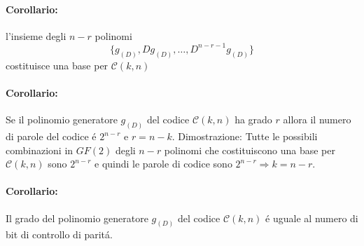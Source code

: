             \paragraph{Corollario:} l'insieme degli $n-r$ polinomi
            \[
                \{g_{(D)},Dg_{(D)},\dots,D^{n-r-1}g_{(D)}\}    
            \]
            costituisce una base per $\mathcal{C}(k,n)$
            
            \paragraph{Corollario:} Se il polinomio generatore $g_{(D)}$ del codice $\mathcal{C}(k,n)$ ha grado $r$ allora
            il numero di parole del codice é $2^{n-r}$ e $r=n-k$. Dimostrazione:
            Tutte le possibili combinazioni in $GF(2)$ degli $n-r$ polinomi che costituiscono una base per $\mathcal{C}(k,n)$ sono $2^{n-r}$
            e quindi le parole di codice sono $2^{n-r}\Rightarrow k=n-r$.

            \paragraph{Corollario:} Il grado del polinomio generatore $g_{(D)}$ del codice $\mathcal{C}(k,n)$ é uguale al numero di bit di controllo di paritá.

